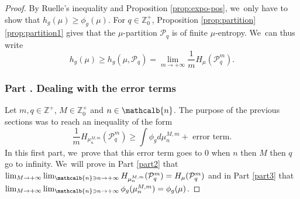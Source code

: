 \documentclass[10pt]{amsart}
\renewcommand{\thesubsubsection}{\arabic{subsubsection}}
\newcommand{\mcbn}{{\mathcalb{n}}}
\theoremstyle{definition}
\newcommand{\bbZ}{{\mathbb{Z}}}
\begin{document}
\begin{proof}
By Ruelle's inequality \cite{Ruelle1978} and Proposition \ref{prop:expo-pos}, we~only have to show that $h_g(\mu) \geq \phi_g(\mu)$.
For $q \in \bbZ_0^+$, Proposition \ref{prop:partition}\eqref{prop:partition1} gives that the $\mu$-partition $\mathcal{P}_q$ is of finite $\mu$-entropy. We~can thus write
\[
h_g(\mu) \geq h_g(\mu,\mathcal{P}_q) = \lim_{m \to +\infty} \frac{1}{m} H_{\mu}(\mathcal{P}_q^m).
\]

\label{part1}%
\subsubsection*{Part \thesubsubsection. Dealing with the error terms}

Let $m,q \in \bbZ^+$, $M \in \bbZ_0^+$ and $n \in \mcbn$.
The purpose of the previous sections was to reach an inequality of the form
\[
\frac{1}{m} H_{\mu_n^{M,m}}(\mathcal{P}_q^m) \geq \int \phi_g d \mu_n^{M,m} + \text{ error term.}
\]
In this first part, we~prove that this error term goes to 0 when $n$ then $M$ then $q$ go to infinity. We~will prove in Part \ref{part2} that
$\lim_{M \to +\infty} \lim_{\mcbn \ni n \to +\infty} H_{\mu_n^{M,m}}(\mathcal{P}_q^m) = H_{\mu}(\mathcal{P}_q^m)$ and in Part \ref{part3} that $\lim_{M \to +\infty} \lim_{\mcbn \ni n \to +\infty} \phi_g(\mu_n^{M,m}) = \phi_g(\mu)$.


\end{proof}
\end{document}
